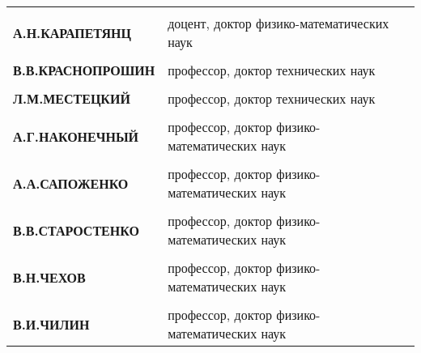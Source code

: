 {\begin{tabular}{ll}
\rule{0pt}{4pt} & \\
{\qquad\scriptsize\sf \textbf{А.\;Н.\;КАРАПЕТЯНЦ}}     & {\scriptsize\sf доцент, доктор физико-математических наук}\\

\rule{0pt}{4pt} & \\
{\qquad\scriptsize\sf \textbf{В.\;В.\;КРАСНОПРОШИН}}   & {\scriptsize\sf профессор, доктор технических наук}\\

\rule{0pt}{4pt} & \\
{\qquad\scriptsize\sf \textbf{Л.\;М.\;МЕСТЕЦКИЙ}}   & {\scriptsize\sf профессор, доктор технических наук}\\

\rule{0pt}{3pt} & \\
{\qquad\scriptsize\sf \textbf{А.\;Г.\;НАКОНЕЧНЫЙ}}     & {\scriptsize\sf профессор, доктор физико-математических наук}\\

\rule{0pt}{4pt} & \\
{\qquad\scriptsize\sf \textbf{А.\;А.\;САПОЖЕНКО}}      & {\scriptsize\sf профессор, доктор физико-математических наук}\\

\rule{0pt}{4pt} & \\
{\qquad\scriptsize\sf \textbf{В.\;В.\;СТАРОСТЕНКО}}      & {\scriptsize\sf профессор, доктор физико-математических наук}\\

\rule{0pt}{4pt} & \\
{\qquad\scriptsize\sf \textbf{В.\;Н.\;ЧЕХОВ}}          & {\scriptsize\sf профессор, доктор физико-математических наук}\\

\rule{0pt}{4pt} & \\
{\qquad\scriptsize\sf \textbf{В.\;И.\;ЧИЛИН}}          & {\scriptsize\sf профессор, доктор физико-математических наук}\\

\end{tabular}

}
